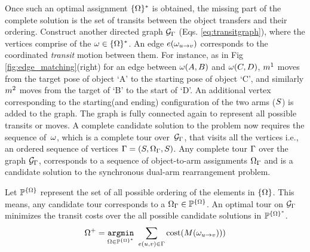 Once such an optimal assignment $ \{{{\Omega}}\}^* $ is obtained, the missing part of the complete solution is the set of transits between the object transfers and their ordering. Construct another directed graph $ \mathcal{G}_{{\Gamma}} $ (Eqs. \ref{eq:transitgraph}), where the vertices comprise of the $ {\omega} \in \{{{\Omega}}\}^*$. An edge $ e({\omega}_{u\rightarrow v}) $ corresponds to the coordinated \textit{transit} motion between them. For instance, as in Fig \ref{fig:edge_matching}(right) for an edge between $ {\omega}(A,B) $ and $ {\omega}(C,D) $, $ m^1 $ moves from the target pose of object `A' to the starting pose of object `C', and similarly $ m^2 $ moves from the target of `B' to the start of `D'. An additional vertex corresponding to the starting(and ending) configuration of the two arms ($ S $) is added to the graph. The graph is fully connected again to represent all possible transits or moves.  
A complete candidate solution to the problem now requires the sequence of~$ {\omega} $, 
which is a complete tour over~$ \mathcal{G}_{{\Gamma}} $, that visits all the vertices i.e., an ordered sequence of vertices ${\Gamma} = ( {S}, {{\Omega}}_{\Gamma}, {S}  )$.
{
\lemma [Tour]
Any complete tour $ {\Gamma} $ over the graph $ \mathcal{G}_{{\Gamma}} $, corresponds to a sequence of object-to-arm assignments $ {{\Omega}}_{\Gamma} $ and is a candidate solution to the synchronous dual-arm rearrangement problem.
}



Let $ \mathbb{P}^{\{{{\Omega}}\}} $ represent the set of all possible ordering of the elements in $ \{{{\Omega}}\} $. This means, any candidate tour corresponds to a $ {{\Omega}}_{\Gamma}\in\mathbb{P}^{\{{{\Omega}}\}} $. An optimal tour on $ \mathcal{G}_{{\Gamma}} $ minimizes the transit costs over the all possible candidate solutions in  $ \mathbb{P}^{\{{{\Omega}}\}^*} $.
\begin{equation}
{{\Omega}}^+ = \underset{ {{\Omega}} \in  \mathbb{P}^{\{{{\Omega}}\}^*}   }{ \mathtt{argmin} } \ \sum_{e(u,v)\in{\Gamma}}\textup{cost}({M}( {\omega}_{u\rightarrow v} ))  )
\end{equation}

